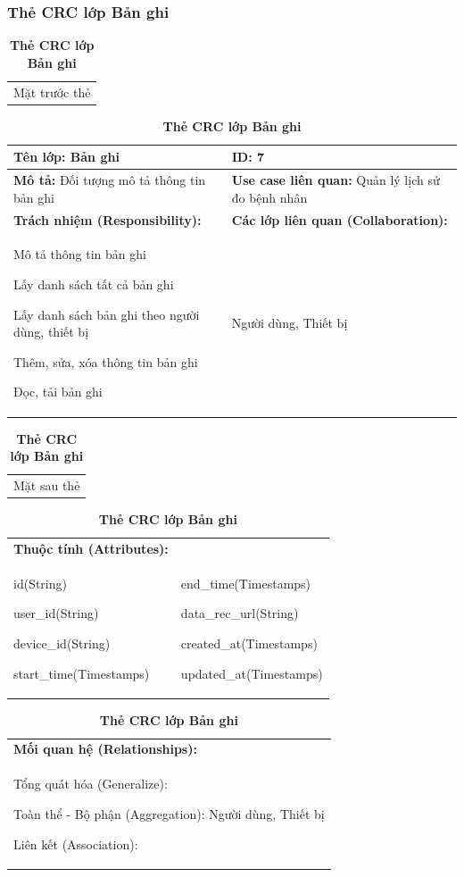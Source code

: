 \subsubsection{Thẻ CRC lớp Bản ghi}
  \begin{table}[H]
    \caption{\bfseries \fontsize{12pt}{0pt}\selectfont Thẻ CRC lớp Bản ghi}
    \centering
    \begin{tabularx}{0.9\textwidth}{X}
      Mặt trước thẻ
    \end{tabularx}
    \begin{tabularx}{0.9\textwidth}{|X|X|}
      \hline
      \textbf{Tên lớp:} Bản ghi & \textbf{ID:} 7 \\
      \hline
      \textbf{Mô tả:} Đối tượng mô tả thông tin bản ghi & \textbf{Use case liên quan:} Quản lý lịch sử đo bệnh nhân \\
      \hline
      \textbf{Trách nhiệm (Responsibility):} & \textbf{Các lớp liên quan (Collaboration):} \\
      Mô tả thông tin bản ghi 

      Lấy danh sách tất cả bản ghi

      Lấy danh sách bản ghi theo người dùng, thiết bị

      Thêm, sửa, xóa thông tin bản ghi

      Đọc, tải bản ghi
      & 
      Người dùng, Thiết bị
      \\
      \hline
    \end{tabularx}
    \begin{tabularx}{0.9\textwidth}{X}
      Mặt sau thẻ
    \end{tabularx}
    \begin{tabularx}{0.9\textwidth}{|X|X|}
      \hline
      \textbf{Thuộc tính (Attributes):} & \\
      id(String) 
      
      user\_id(String)

      device\_id(String)

      start\_time(Timestamps)
      & 
      end\_time(Timestamps) 
      
      data\_rec\_url(String) 
      
      created\_at(Timestamps)

      updated\_at(Timestamps)
      \\
      \hline
    \end{tabularx}
    \begin{tabularx}{0.9\textwidth}{|X|}
      \textbf{Mối quan hệ (Relationships):} \\
      Tổng quát hóa (Generalize):  

      Toàn thể - Bộ phận (Aggregation): Người dùng, Thiết bị
      
      Liên kết (Association):  
      \\
      \hline
    \end{tabularx}
  \end{table}

